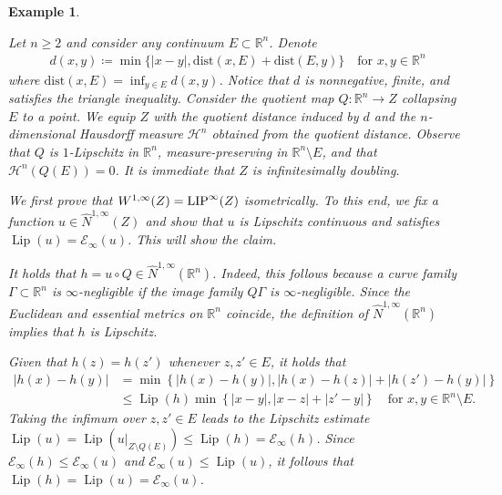 \documentclass[reqno]{amsart}
\newcommand{\LIP}{{\rm LIP}}
\numberwithin{equation}{section}
\newtheorem{example}[theorem]{Example}
\theoremstyle{remark}
\DeclareMathOperator{\lip}{Lip}
\begin{document}
\begin{example}\label{ex:example:collapsing}
{\em Let $n \geq 2$ and consider any continuum $E \subset \mathbb{R}^{n}$. Denote
\begin{align*}
    d(x,y) \coloneqq \min\{ |x-y|, \mathrm{dist}(x,E) + \mathrm{dist}(E,y) \}
    \quad\text{for $x, y \in \mathbb{R}^{n}$}
\end{align*}
where $\mathrm{dist}(x,E) = \inf_{ y \in E } d( x, y )$. Notice that $d$ is nonnegative, finite, and satisfies the triangle inequality. Consider the quotient map $Q \colon \mathbb{R}^{n} \rightarrow Z$ collapsing $E$ to a point. We equip $Z$ with the quotient distance induced by $d$ and the $n$-dimensional Hausdorff measure $\mathcal{H}^n$ obtained from the quotient distance. Observe that $Q$ is $1$-Lipschitz in $\mathbb{R}^n$, measure-preserving in $\mathbb{R}^{n} \setminus E$, and that $\mathcal{H}^{n}( Q(E) ) = 0$. It is immediate that $Z$ is infinitesimally doubling.

We first prove that $W^{1,\infty}(Z) = \LIP^{\infty}(Z)$ isometrically. To this end, we fix a function $u\in\widehat N^{1,\infty}(Z)$ and show that $u$ is Lipschitz continuous and satisfies $\lip(u) = \mathscr{E}_{\infty}(u)$. This will show the claim.

It holds that $h = u \circ Q \in \widehat{N}^{1,\infty}(\mathbb{R}^n)$. Indeed, this follows because a curve family $\Gamma \subset \mathbb{R}^n$ is $\infty$-negligible if the image family $Q\Gamma$ is $\infty$-negligible. Since the Euclidean and essential metrics on $\mathbb{R}^n$ coincide, the definition of  $\widehat{N}^{1,\infty}(\mathbb{R}^n)$ implies that $h$ is Lipschitz.

Given that $h(z) = h(z')$ whenever $z, z' \in E$, it holds that
\begin{align*}
    | h(x) - h(y) |
    &=
    \min\left\{
        |h(x)-h(y)|,
        | h(x)-h(z) | + | h(z') - h(y) |
    \right\}
    \\
    &\leq
    \lip(h)
    \min\left\{
        | x-y |,
        | x-z | + | z'-y |
    \right\}
    \quad\text{for $x,y \in \mathbb{R}^n \setminus E$.}
\end{align*}
Taking the infimum over $z, z' \in E$ leads to the Lipschitz estimate $\lip(u) = \lip( u|_{ Z \setminus Q(E) } ) \leq \lip(h) = \mathscr{E}_{\infty}(h)$. Since $\mathscr{E}_{\infty}(h) \leq \mathscr{E}_{\infty}(u)$ and $\mathscr{E}_{\infty}(u) \leq \lip(u)$, it follows that $\lip( h ) = \lip( u ) = \mathscr{E}_{\infty}(u)$.

}
\end{example}
\end{document}
